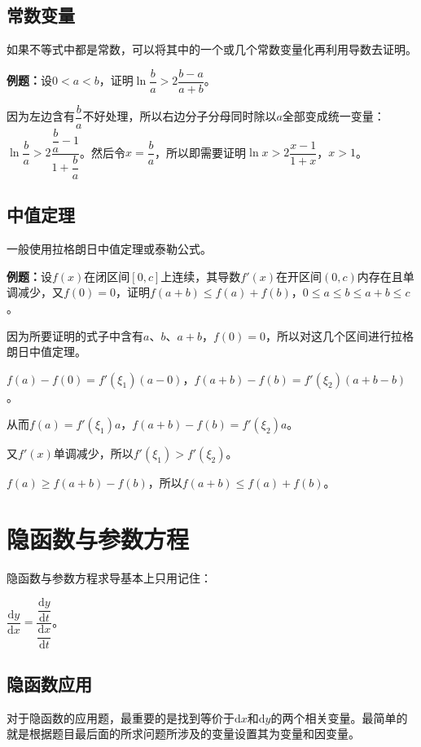 \documentclass[UTF8, 12pt]{ctexart}
\begin{document}
\subsection{常数变量}

如果不等式中都是常数，可以将其中的一个或几个常数变量化再利用导数去证明。

\textbf{例题：}设$0<a<b$，证明$\ln\dfrac{b}{a}>2\dfrac{b-a}{a+b}$。

因为左边含有$\dfrac{b}{a}$不好处理，所以右边分子分母同时除以$a$全部变成统一变量：$\ln\dfrac{b}{a}>2\dfrac{\dfrac{b}{a}-1}{1+\dfrac{b}{a}}$。然后令$x=\dfrac{b}{a}$，所以即需要证明$\ln x>2\dfrac{x-1}{1+x}$，$x>1$。

\subsection{中值定理}

一般使用拉格朗日中值定理或泰勒公式。

\textbf{例题：}设$f(x)$在闭区间$[0,c]$上连续，其导数$f'(x)$在开区间$(0,c)$内存在且单调减少，又$f(0)=0$，证明$f(a+b)\leqslant f(a)+f(b)$，$0\leqslant a\leqslant b\leqslant a+b\leqslant c$。

因为所要证明的式子中含有$a$、$b$、$a+b$，$f(0)=0$，所以对这几个区间进行拉格朗日中值定理。

$f(a)-f(0)=f'(\xi_1)(a-0)$，$f(a+b)-f(b)=f'(\xi_2)(a+b-b)$。

从而$f(a)=f'(\xi_1)a$，$f(a+b)-f(b)=f'(\xi_2)a$。

又$f'(x)$单调减少，所以$f'(\xi_1)>f'(\xi_2)$。

$f(a)\geqslant f(a+b)-f(b)$，所以$f(a+b)\leqslant f(a)+f(b)$。

\section{隐函数与参数方程}

隐函数与参数方程求导基本上只用记住：\medskip

$\dfrac{\textrm{d}y}{\textrm{d}x}=\dfrac{\dfrac{\textrm{d}y}{\textrm{d}t}}{\dfrac{\textrm{d}x}{\textrm{d}t}}$。

\subsection{隐函数应用}

对于隐函数的应用题，最重要的是找到等价于$\textrm{d}x$和$\textrm{d}y$的两个相关变量。最简单的就是根据题目最后面的所求问题所涉及的变量设置其为变量和因变量。
\end{document}
